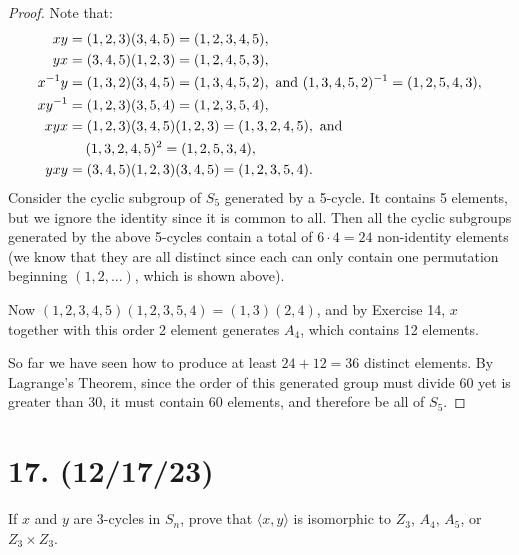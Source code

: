 \documentclass{article}
\begin{document}
\begin{enumerate}[label=(\alph*), itemsep=0em]
\begin{proof}
            Note that:
            \begin{align*}
                xy &= (1, 2, 3)(3, 4, 5) = (1, 2, 3, 4, 5), \\
                yx &= (3, 4, 5)(1, 2, 3) = (1, 2, 4, 5, 3), \\
                x^{-1}y &= (1, 3, 2)(3, 4, 5) = (1, 3, 4, 5, 2), \text{ and } (1, 3, 4, 5, 2)^{-1} = (1, 2, 5, 4, 3), \\
                xy^{-1} &= (1, 2, 3)(3, 5, 4) = (1, 2, 3, 5, 4), \\
                xyx &= (1, 2, 3)(3, 4, 5)(1, 2, 3) = (1, 3, 2, 4, 5), \text{ and } \\
                & \hspace{1.25em} (1, 3, 2, 4, 5)^2 = (1, 2, 5, 3, 4), \\
                yxy &= (3, 4, 5)(1, 2, 3)(3, 4, 5) = (1, 2, 3, 5, 4).
            \end{align*}
            Consider the cyclic subgroup of $S_5$ generated by a 5-cycle. It contains 5 elements, but we ignore the identity since it is common to all. Then all the cyclic subgroups generated by the above 5-cycles contain a total of $6 \cdot 4 = 24$ non-identity elements (we know that they are all distinct since each can only contain one permutation beginning $(1, 2, ...)$, which is shown above).

            Now $(1, 2, 3, 4, 5)(1, 2, 3, 5, 4) = (1, 3)(2, 4)$, and by Exercise 14, $x$ together with this order 2 element generates $A_4$, which contains 12 elements.

            So far we have seen how to produce at least $24 + 12 = 36$ distinct elements. By Lagrange's Theorem, since the order of this generated group must divide 60 yet is greater than 30, it must contain 60 elements, and therefore be all of $S_5$.
          \end{proof}
\end{enumerate}

\section*{17. (12/17/23)}

If $x$ and $y$ are 3-cycles in $S_n$, prove that $\langle x, y \rangle$ is isomorphic to $Z_3$, $A_4$, $A_5$, or $Z_3 \times Z_3$.
\end{document}
